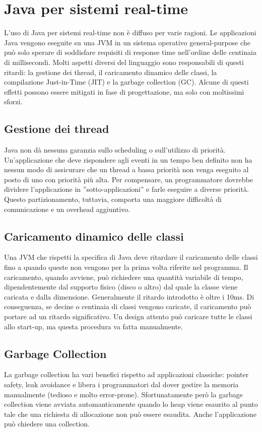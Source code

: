 \section{Java per sistemi real-time}
L'uso di Java per sistemi real-time non è diffuso per varie ragioni. Le applicazioni Java vengono eseguite su una JVM in un sistema operativo general-purpose che può solo sperare di soddisfare requisiti di response time nell'ordine delle centinaia di millisecondi. Molti aspetti diversi del linguaggio sono responsabili di questi ritardi: la gestione dei thread, il caricamento dinamico delle classi, la compilazione Just-in-Time (JIT) e la garbage collection (GC). Alcune di questi effetti possono essere mitigati in fase di progettazione, ma solo con moltissimi sforzi. 

\subsection{Gestione dei thread}
Java non dà nessuna garanzia sullo scheduling o sull'utilizzo di priorità. Un'applicazione che deve rispondere agli eventi in un tempo ben definito non ha nessun modo di assicurare che un thread a bassa priorità non venga eseguito al posto di uno con priorità più alta. Per compensare, un programmatore dovrebbe dividere l'applicazione in ''sotto-applicazioni'' e farle eseguire a diverse priorità. Questo partizionamento, tuttavia, comporta una maggiore difficoltà di comunicazione e un overhead aggiuntivo.

\subsection{Caricamento dinamico delle classi}
Una JVM che rispetti la specifica di Java deve ritardare il caricamento delle classi fino a quando queste non vengono per la prima volta riferite nel programma. Il caricamento, quando avviene, può richiedere una quantità variabile di tempo, dipendentemente dal supporto fisico (disco o altro) dal quale la classe viene caricata e dalla dimensione. Generalmente il ritardo introdotto è oltre i 10ms. Di conseguenza, se decine o centinaia di classi vengono caricate, il caricamento può portare ad un ritardo significativo. Un design attento può caricare tutte le classi allo start-up, ma questa procedura va fatta manualmente.

\subsection{Garbage Collection}
La garbage collection ha vari benefici rispetto ad applicazioni classiche: pointer safety, leak avoidance e libera i programmatori dal dover gestire la memoria manualmente (tedioso e molto error-prone). Sfortunatamente però la garbage collection viene avviata automanticamente quando lo heap viene esaurito al punto tale che una richiesta di allocazione non può essere esaudita. Anche l'applicazione può chiedere una collection.

